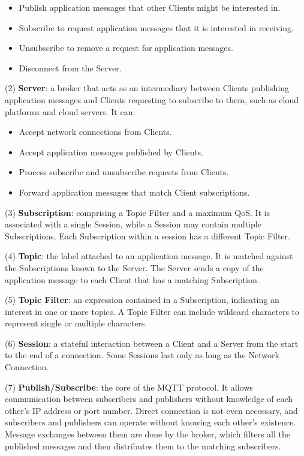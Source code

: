 \documentclass[a4paper,12pt]{book}
\begin{document}
\begin{itemize}[noitemsep]
    \item  Publish application messages that other Clients might be interested in.
    \item Subscribe to request application messages that it is interested in receiving.
    \item Unsubscribe to remove a request for application messages.
    \item Disconnect from the Server.
\end{itemize}

(2) \textbf{Server}: a broker that acts as an intermediary between Clients publishing application messages and Clients requesting to subscribe to them, such as cloud platforms and cloud servers. It can:

\begin{itemize}[noitemsep]
    \item Accept network connections from Clients.
    \item Accept application messages published by Clients.
    \item Process subscribe and unsubscribe requests from Clients.
    \item Forward application messages that match Client subscriptions.
\end{itemize}

(3) \textbf{Subscription}: comprising a Topic Filter and a maximum QoS. It is associated with a single Session, while a Session may contain multiple Subscriptions. Each Subscription within a session has a different Topic Filter.

(4) \textbf{Topic}: the label attached to an application message. It is matched against the Subscriptions known to the Server. The Server sends a copy of the application message to each Client that has a matching Subscription.

(5) \textbf{Topic Filter}: an expression contained in a Subscription, indicating an interest in one or more topics. A Topic Filter can include wildcard characters to represent single or multiple characters.

(6) \textbf{Session}: a stateful interaction between a Client and a Server from the start to the end of a connection. Some Sessions last only as long as the Network Connection.

(7) \textbf{Publish/Subscribe}: the core of the MQTT protocol. It allows communication between subscribers and publishers without knowledge of each other’s IP address or port number. Direct connection is not even necessary, and subscribers and publishers can operate without knowing each other's existence. Message exchanges between them are done by the broker, which filters all the published messages and then distributes them to the matching subscribers.
\end{document}

